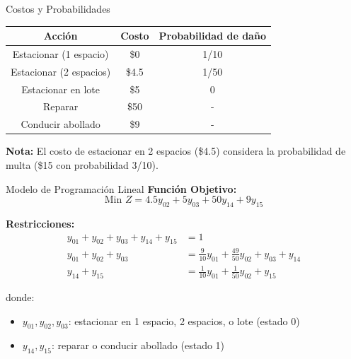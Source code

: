 \documentclass{beamer}
\begin{document}
\begin{frame}{Costos y Probabilidades}
    \centering

    \begin{tabular}{c|cc}
    \toprule
    Acción  & Costo & Probabilidad de daño\\
    \midrule
    Estacionar (1 espacio) & \$0 &  1/10  \\
    Estacionar (2 espacios) & \$4.5 & 1/50 \\
    Estacionar en lote & \$5 & 0 \\
    Reparar & \$50 & -  \\
    Conducir abollado &\$9 & - \\
    \bottomrule
    \end{tabular}

    \vspace{1em}

    \small
    \textbf{Nota:} El costo de estacionar en 2 espacios (\$4.5) considera la probabilidad de multa (\$15 con probabilidad 3/10).
\end{frame}

\begin{frame}{Modelo de Programación Lineal}
    \small
    \textbf{Función Objetivo:}
    \[
    \text{Min } Z = 4.5y_{02} + 5y_{03} + 50y_{14} + 9y_{15}
    \]

    \textbf{Restricciones:}
    \[
    \begin{aligned}
    y_{01} + y_{02} + y_{03} + y_{14} + y_{15} &= 1 \\
    y_{01} + y_{02} + y_{03} &= \frac{9}{10}y_{01} + \frac{49}{50}y_{02} + y_{03} + y_{14} \\
    y_{14} + y_{15} &= \frac{1}{10}y_{01} + \frac{1}{50}y_{02} + y_{15}
    \end{aligned}
    \]

    donde:
    \begin{itemize}
        \item $y_{01}, y_{02}, y_{03}$: estacionar en 1 espacio, 2 espacios, o lote (estado 0)
        \item $y_{14}, y_{15}$: reparar o conducir abollado (estado 1)
    \end{itemize}
\end{frame}
\end{document}
